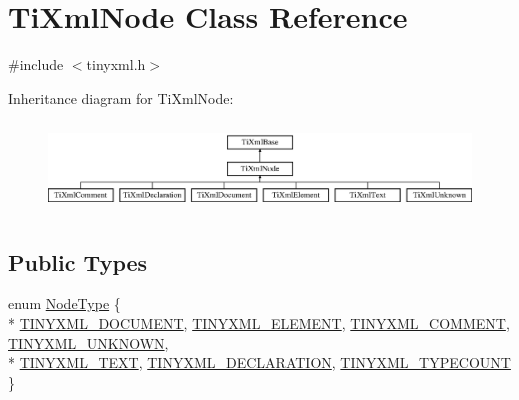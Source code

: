 \hypertarget{class_ti_xml_node}{\section{Ti\-Xml\-Node Class Reference}
\label{class_ti_xml_node}
}


{\ttfamily \#include $<$tinyxml.\-h$>$}

Inheritance diagram for Ti\-Xml\-Node\-:\begin{figure}[H]
\begin{center}
\leavevmode
\includegraphics[height=2.413793cm]{class_ti_xml_node}
\end{center}
\end{figure}
\subsection*{Public Types}
\begin{DoxyCompactItemize}
\item 
enum \hyperlink{class_ti_xml_node_a836eded4920ab9e9ef28496f48cd95a2}{Node\-Type} \{ \\*
\hyperlink{class_ti_xml_node_a836eded4920ab9e9ef28496f48cd95a2a76c4c520453398cd033e8b97ec9a0b04}{T\-I\-N\-Y\-X\-M\-L\-\_\-\-D\-O\-C\-U\-M\-E\-N\-T}, 
\hyperlink{class_ti_xml_node_a836eded4920ab9e9ef28496f48cd95a2a9ad167b17c3148d7a018fde9a41ce976}{T\-I\-N\-Y\-X\-M\-L\-\_\-\-E\-L\-E\-M\-E\-N\-T}, 
\hyperlink{class_ti_xml_node_a836eded4920ab9e9ef28496f48cd95a2a742eb78855db1e81614848072de03721}{T\-I\-N\-Y\-X\-M\-L\-\_\-\-C\-O\-M\-M\-E\-N\-T}, 
\hyperlink{class_ti_xml_node_a836eded4920ab9e9ef28496f48cd95a2a7376f9420c8ab507842c8a0813bb077e}{T\-I\-N\-Y\-X\-M\-L\-\_\-\-U\-N\-K\-N\-O\-W\-N}, 
\\*
\hyperlink{class_ti_xml_node_a836eded4920ab9e9ef28496f48cd95a2aa6177e9506461cdca7062559387a2714}{T\-I\-N\-Y\-X\-M\-L\-\_\-\-T\-E\-X\-T}, 
\hyperlink{class_ti_xml_node_a836eded4920ab9e9ef28496f48cd95a2a1e2351ad8cd0c805538d94222f3d8cd0}{T\-I\-N\-Y\-X\-M\-L\-\_\-\-D\-E\-C\-L\-A\-R\-A\-T\-I\-O\-N}, 
\hyperlink{class_ti_xml_node_a836eded4920ab9e9ef28496f48cd95a2a878567737ed539bd3de6a941027e9309}{T\-I\-N\-Y\-X\-M\-L\-\_\-\-T\-Y\-P\-E\-C\-O\-U\-N\-T}
 \}
\end{DoxyCompactItemize}
